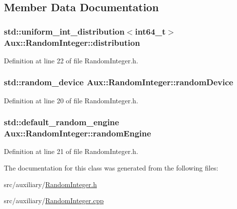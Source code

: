 \subsection{Member Data Documentation}
\hypertarget{class_aux_1_1_random_integer_a47ba003fbfaade85bb3072ff1063336e}{
\subsubsection[{distribution}]{\setlength{\rightskip}{0pt plus 5cm}std\-::uniform\-\_\-int\-\_\-distribution$<$int64\-\_\-t$>$ Aux\-::\-Random\-Integer\-::distribution\hspace{0.3cm}{\ttfamily [protected]}}}\label{class_aux_1_1_random_integer_a47ba003fbfaade85bb3072ff1063336e}


Definition at line 22 of file Random\-Integer.\-h.

\hypertarget{class_aux_1_1_random_integer_ad53ce69ad39005e2d155c3d7d3557873}{
\subsubsection[{random\-Device}]{\setlength{\rightskip}{0pt plus 5cm}std\-::random\-\_\-device Aux\-::\-Random\-Integer\-::random\-Device\hspace{0.3cm}{\ttfamily [protected]}}}\label{class_aux_1_1_random_integer_ad53ce69ad39005e2d155c3d7d3557873}


Definition at line 20 of file Random\-Integer.\-h.

\hypertarget{class_aux_1_1_random_integer_a5a4fca08fd29e0b6304d8294441c5711}{
\subsubsection[{random\-Engine}]{\setlength{\rightskip}{0pt plus 5cm}std\-::default\-\_\-random\-\_\-engine Aux\-::\-Random\-Integer\-::random\-Engine\hspace{0.3cm}{\ttfamily [protected]}}}\label{class_aux_1_1_random_integer_a5a4fca08fd29e0b6304d8294441c5711}


Definition at line 21 of file Random\-Integer.\-h.



The documentation for this class was generated from the following files\-:\begin{DoxyCompactItemize}
\item 
src/auxiliary/\hyperlink{_random_integer_8h}{Random\-Integer.\-h}\item 
src/auxiliary/\hyperlink{_random_integer_8cpp}{Random\-Integer.\-cpp}\end{DoxyCompactItemize}
